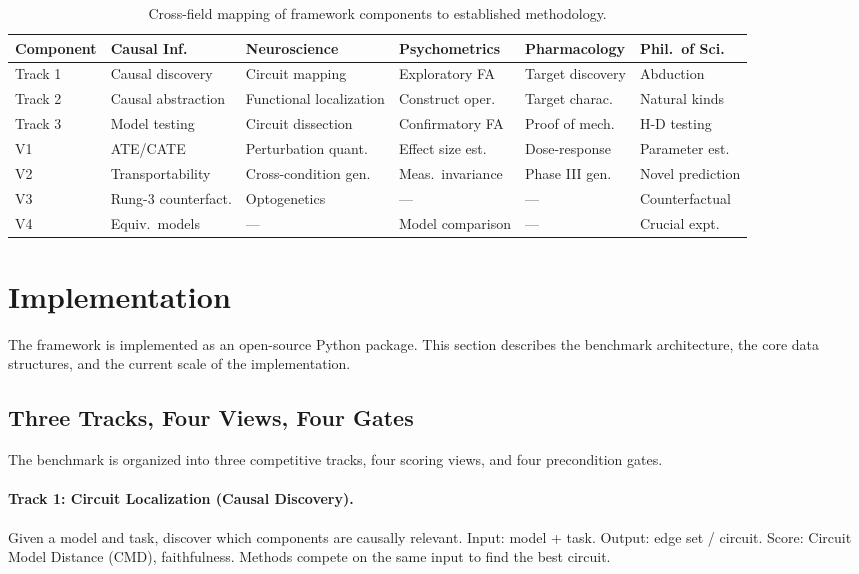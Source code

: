 \documentclass[10pt]{article}
\newcommand{\tighttable}{\setlength{\tabcolsep}{4pt}\renewcommand{\arraystretch}{1.05}}
\begin{document}
\begin{table}[t]
\centering
\tighttable
\caption{Cross-field mapping of framework components to established methodology.}
\label{tab:crossfield}
\small
\begin{tabular}{@{}lp{2.2cm}p{2.2cm}p{2.0cm}p{1.8cm}p{2.0cm}@{}}
\toprule
\textbf{Component} & \textbf{Causal Inf.} & \textbf{Neuroscience} & \textbf{Psychometrics} & \textbf{Pharmacology} & \textbf{Phil.\ of Sci.} \\
\midrule
Track 1 & Causal discovery & Circuit mapping & Exploratory FA & Target discovery & Abduction \\
Track 2 & Causal abstraction & Functional localization & Construct oper. & Target charac. & Natural kinds \\
Track 3 & Model testing & Circuit dissection & Confirmatory FA & Proof of mech. & H-D testing \\
V1 & ATE/CATE & Perturbation quant. & Effect size est. & Dose-response & Parameter est. \\
V2 & Transportability & Cross-condition gen. & Meas.\ invariance & Phase III gen. & Novel prediction \\
V3 & Rung-3 counterfact. & Optogenetics & --- & --- & Counterfactual \\
V4 & Equiv.\ models & --- & Model comparison & --- & Crucial expt. \\
\bottomrule
\end{tabular}
\end{table}

\section{Implementation}
\label{sec:implementation}

The framework is implemented as an open-source Python package. This section describes the benchmark architecture, the core data structures, and the current scale of the implementation.

\subsection{Three Tracks, Four Views, Four Gates}
\label{sec:3t4v4g}

The benchmark is organized into three competitive tracks, four scoring views, and four precondition gates.

\paragraph{Track 1: Circuit Localization (Causal Discovery).} Given a model and task, discover which components are causally relevant. Input: model + task. Output: edge set / circuit. Score: Circuit Model Distance (CMD), faithfulness. Methods compete on the same input to find the best circuit.
\end{document}
